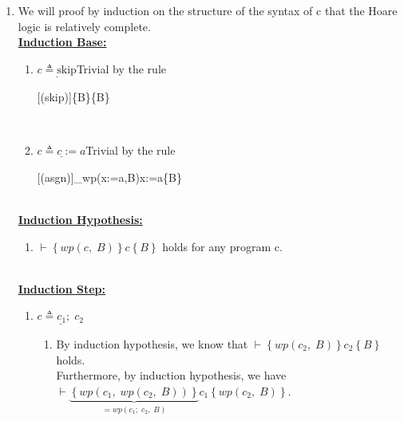 \documentclass[12pt]{scrartcl}
\begin{document}
	\begin{enumerate}
	\item[] We will proof by induction on the structure of the syntax of c that the Hoare logic is relatively complete.\\
	
	\textbf{\underline{Induction Base:}}\\
	\begin{enumerate}
	\item[] $\underline{c\triangleq \text{skip}}$\qquad Trivial by the 	rule\\
		\begin{center}
		\normalsize
		\begin{prooftree}
		[\small{(skip)}]{\left\{B\right\}\left\{B\right\}}
		\end{prooftree}
		\end{center}
		\hspace*{0pt}\\
	\item[] $\underline{c\triangleq c:=a}$\qquad Trivial by the rule\\
	\begin{center}
	\normalsize
	\begin{prooftree}
	[\small(asgn)]{_{wp\left(x:=a,\;B\right)}x:=a\left\{B\right\}}
	\end{prooftree}
	\end{center}
	\end{enumerate}
	\hspace*{0pt}\\[1cm]
	\textbf{\underline{Induction Hypothesis:}}\\
	\begin{enumerate}
	\item[] $\vdash\left\{wp\left(c,\;B\right)\right\}c\left\{B\right\}$ holds for any program c.
	\end{enumerate}
	\hspace*{0pt}\\[1cm]
	\textbf{\underline{Induction Step:}}\\
	\begin{enumerate}
	\item[] $\underline{c\triangleq c_{1};\;c_{2}}$\\
	\begin{enumerate}
	\item[] By induction hypothesis, we know that $\vdash\left\{wp\left(c_{2},\;B\right)\right\}c_{2}\left\{B\right\}$ holds.\\
	Furthermore, by induction hypothesis, we have\\$\vdash\underbrace{\left\{wp\left(c_{1},\;wp\left(c_{2},\;B\right)\right)\right\}}_{=wp\left(c_{1};\;c_{2},\;B\right)}c_{1}\left\{wp\left(c_{2},\;B\right)\right\}$.\\
	

\end{enumerate}
\end{enumerate}
\end{enumerate}
\end{document}
